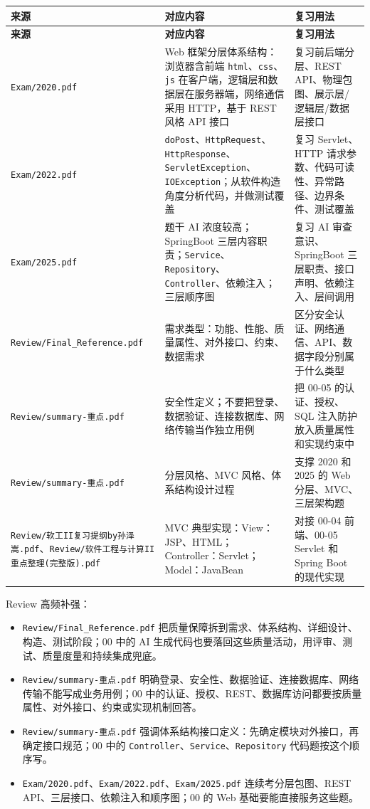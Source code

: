 \documentclass[UTF8,zihao=-4]{ctexart}
\begin{document}
{
\footnotesize
\begin{longtable}{|>{\raggedright\arraybackslash}p{}|>{\raggedright\arraybackslash}p{}|>{\raggedright\arraybackslash}p{}|}
\hline
\textbf{来源} & \textbf{对应内容} & \textbf{复习用法} \\
\hline
\endfirsthead
\hline
\textbf{来源} & \textbf{对应内容} & \textbf{复习用法} \\
\hline
\endhead
\texttt{Exam/2020.pdf} & Web 框架分层体系结构：浏览器含前端 \texttt{html}、\texttt{css}、\texttt{js} 在客户端，逻辑层和数据层在服务器端，网络通信采用 HTTP，基于 REST 风格 API 接口 & 复习前后端分层、REST API、物理包图、展示层/逻辑层/数据层接口 \\
\hline
\texttt{Exam/2022.pdf} & \texttt{doPost}、\texttt{HttpRequest}、\texttt{HttpResponse}、\texttt{ServletException}、\texttt{IOException}；从软件构造角度分析代码，并做测试覆盖 & 复习 Servlet、HTTP 请求参数、代码可读性、异常路径、边界条件、测试覆盖 \\
\hline
\texttt{Exam/2025.pdf} & 题干 AI 浓度较高；SpringBoot 三层内容职责；\texttt{Service}、\texttt{Repository}、\texttt{Controller}、依赖注入；三层顺序图 & 复习 AI 审查意识、SpringBoot 三层职责、接口声明、依赖注入、层间调用 \\
\hline
\texttt{Review/Final\_Reference.pdf} & 需求类型：功能、性能、质量属性、对外接口、约束、数据需求 & 区分安全认证、网络通信、API、数据字段分别属于什么类型 \\
\hline
\texttt{Review/summary-重点.pdf} & 安全性定义；不要把登录、数据验证、连接数据库、网络传输当作独立用例 & 把 00-05 的认证、授权、SQL 注入防护放入质量属性和实现约束中 \\
\hline
\texttt{Review/summary-重点.pdf} & 分层风格、MVC 风格、体系结构设计过程 & 支撑 2020 和 2025 的 Web 分层、MVC、三层架构题 \\
\hline
\texttt{Review/软工II复习提纲by孙泽嵩.pdf}、\texttt{Review/软件工程与计算II重点整理(完整版).pdf} & MVC 典型实现：View：JSP、HTML；Controller：Servlet；Model：JavaBean & 对接 00-04 前端、00-05 Servlet 和 Spring Boot 的现代实现 \\
\hline
\end{longtable}
}


Review 高频补强：

\begin{itemize}
\item \texttt{Review/Final\_Reference.pdf} 把质量保障拆到需求、体系结构、详细设计、构造、测试阶段；00 中的 AI 生成代码也要落回这些质量活动，用评审、测试、质量度量和持续集成兜底。
\item \texttt{Review/summary-重点.pdf} 明确登录、安全性、数据验证、连接数据库、网络传输不能写成业务用例；00 中的认证、授权、REST、数据库访问都要按质量属性、对外接口、约束或实现机制回答。
\item \texttt{Review/summary-重点.pdf} 强调体系结构接口定义：先确定模块对外接口，再确定接口规范；00 中的 \texttt{Controller}、\texttt{Service}、\texttt{Repository} 代码题按这个顺序写。
\item \texttt{Exam/2020.pdf}、\texttt{Exam/2022.pdf}、\texttt{Exam/2025.pdf} 连续考分层包图、REST API、三层接口、依赖注入和顺序图；00 的 Web 基础要能直接服务这些题。
\end{itemize}
\end{document}
